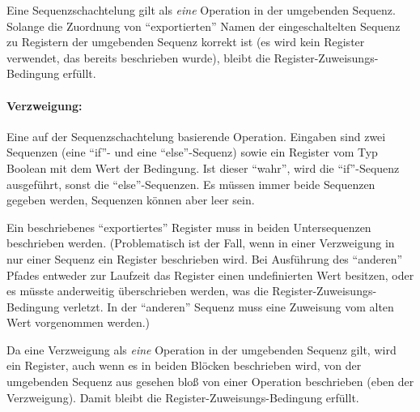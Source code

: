 \documentclass[twoside,a4paper,fleqn,12pt]{article}
\begin{document}
Eine Sequenzschachtelung gilt als \emph{eine} Operation in der umgebenden Sequenz. Solange die Zuordnung von "`exportierten"' Namen der
eingeschaltelten Sequenz zu Registern der umgebenden Sequenz korrekt ist (es wird kein Register verwendet, das bereits beschrieben wurde), bleibt die Register-Zuweisungs-Bedingung erfüllt.

\paragraph{Verzweigung:} Eine auf der Sequenzschachtelung basierende Operation. Eingaben sind zwei Sequenzen (eine ``if''- und eine ``else''-Sequenz) sowie ein Register vom
Typ Boolean mit dem Wert der Bedingung. Ist dieser "`wahr"', wird die ``if''-Sequenz ausgeführt, sonst die ``else''-Sequenzen. Es müssen immer beide Sequenzen
gegeben werden, Sequenzen können aber leer sein.

Ein beschriebenes "`exportiertes"' Register muss in beiden Untersequenzen beschrieben werden. (Problematisch ist der Fall, wenn in einer Verzweigung
in nur einer Sequenz ein Register beschrieben wird. Bei Ausführung des "`anderen"' Pfades entweder zur Laufzeit das Register einen undefinierten Wert besitzen, oder
es müsste anderweitig überschrieben werden, was die Register-Zuweisungs-Bedingung verletzt. In der "`anderen"' Sequenz muss eine Zuweisung vom alten
Wert vorgenommen werden.)

Da eine Verzweigung als \emph{eine} Operation in der umgebenden Sequenz gilt, wird ein Register, auch wenn es in beiden Blöcken beschrieben wird, 
von der umgebenden Sequenz aus gesehen bloß von einer Operation beschrieben (eben der Verzweigung). Damit bleibt die Register-Zuweisungs-Bedingung erfüllt.

\end{document}
